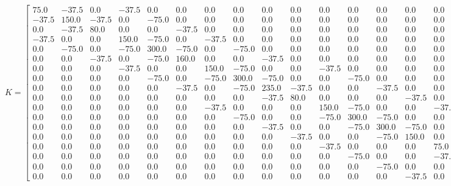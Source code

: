 \documentclass[a4paper, 12pt]{article}
\begin{document}
\begin{landscape}
\[
K = 
\left[\begin{array}{cccccccccccccccccc}75.0 & -37.5 & 0.0 & -37.5 & 0.0 & 0.0 & 0.0 & 0.0 & 0.0 & 0.0 & 0.0 & 0.0 & 0.0 & 0.0 & 0.0 & 0.0 & 0.0 & 0.0\\-37.5 & 150.0 & -37.5 & 0.0 & -75.0 & 0.0 & 0.0 & 0.0 & 0.0 & 0.0 & 0.0 & 0.0 & 0.0 & 0.0 & 0.0 & 0.0 & 0.0 & 0.0\\0.0 & -37.5 & 80.0 & 0.0 & 0.0 & -37.5 & 0.0 & 0.0 & 0.0 & 0.0 & 0.0 & 0.0 & 0.0 & 0.0 & 0.0 & 0.0 & 0.0 & 0.0\\-37.5 & 0.0 & 0.0 & 150.0 & -75.0 & 0.0 & -37.5 & 0.0 & 0.0 & 0.0 & 0.0 & 0.0 & 0.0 & 0.0 & 0.0 & 0.0 & 0.0 & 0.0\\0.0 & -75.0 & 0.0 & -75.0 & 300.0 & -75.0 & 0.0 & -75.0 & 0.0 & 0.0 & 0.0 & 0.0 & 0.0 & 0.0 & 0.0 & 0.0 & 0.0 & 0.0\\0.0 & 0.0 & -37.5 & 0.0 & -75.0 & 160.0 & 0.0 & 0.0 & -37.5 & 0.0 & 0.0 & 0.0 & 0.0 & 0.0 & 0.0 & 0.0 & 0.0 & 0.0\\0.0 & 0.0 & 0.0 & -37.5 & 0.0 & 0.0 & 150.0 & -75.0 & 0.0 & 0.0 & -37.5 & 0.0 & 0.0 & 0.0 & 0.0 & 0.0 & 0.0 & 0.0\\0.0 & 0.0 & 0.0 & 0.0 & -75.0 & 0.0 & -75.0 & 300.0 & -75.0 & 0.0 & 0.0 & -75.0 & 0.0 & 0.0 & 0.0 & 0.0 & 0.0 & 0.0\\0.0 & 0.0 & 0.0 & 0.0 & 0.0 & -37.5 & 0.0 & -75.0 & 235.0 & -37.5 & 0.0 & 0.0 & -37.5 & 0.0 & 0.0 & 0.0 & 0.0 & 0.0\\0.0 & 0.0 & 0.0 & 0.0 & 0.0 & 0.0 & 0.0 & 0.0 & -37.5 & 80.0 & 0.0 & 0.0 & 0.0 & -37.5 & 0.0 & 0.0 & 0.0 & 0.0\\0.0 & 0.0 & 0.0 & 0.0 & 0.0 & 0.0 & -37.5 & 0.0 & 0.0 & 0.0 & 150.0 & -75.0 & 0.0 & 0.0 & -37.5 & 0.0 & 0.0 & 0.0\\0.0 & 0.0 & 0.0 & 0.0 & 0.0 & 0.0 & 0.0 & -75.0 & 0.0 & 0.0 & -75.0 & 300.0 & -75.0 & 0.0 & 0.0 & -75.0 & 0.0 & 0.0\\0.0 & 0.0 & 0.0 & 0.0 & 0.0 & 0.0 & 0.0 & 0.0 & -37.5 & 0.0 & 0.0 & -75.0 & 300.0 & -75.0 & 0.0 & 0.0 & -75.0 & 0.0\\0.0 & 0.0 & 0.0 & 0.0 & 0.0 & 0.0 & 0.0 & 0.0 & 0.0 & -37.5 & 0.0 & 0.0 & -75.0 & 150.0 & 0.0 & 0.0 & 0.0 & -37.5\\0.0 & 0.0 & 0.0 & 0.0 & 0.0 & 0.0 & 0.0 & 0.0 & 0.0 & 0.0 & -37.5 & 0.0 & 0.0 & 0.0 & 75.0 & -37.5 & 0.0 & 0.0\\0.0 & 0.0 & 0.0 & 0.0 & 0.0 & 0.0 & 0.0 & 0.0 & 0.0 & 0.0 & 0.0 & -75.0 & 0.0 & 0.0 & -37.5 & 150.0 & -37.5 & 0.0\\0.0 & 0.0 & 0.0 & 0.0 & 0.0 & 0.0 & 0.0 & 0.0 & 0.0 & 0.0 & 0.0 & 0.0 & -75.0 & 0.0 & 0.0 & -37.5 & 150.0 & -37.5\\0.0 & 0.0 & 0.0 & 0.0 & 0.0 & 0.0 & 0.0 & 0.0 & 0.0 & 0.0 & 0.0 & 0.0 & 0.0 & -37.5 & 0.0 & 0.0 & -37.5 & 75.0\end{array}\right]
\]

\end{landscape}
\end{document}
